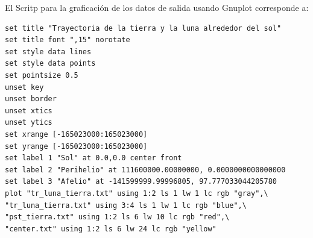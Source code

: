 \documentclass[12pt,a4paper,twoside]{article}
\begin{document}
El Scritp para la graficación de los datos de salida usando Gnuplot corresponde a:
\begin{verbatim}
set title "Trayectoria de la tierra y la luna alrededor del sol"
set title font ",15" norotate
set style data lines
set style data points
set pointsize 0.5
unset key
unset border
unset xtics
unset ytics
set xrange [-165023000:165023000]
set yrange [-165023000:165023000]
set label 1 "Sol" at 0.0,0.0 center front
set label 2 "Perihelio" at 111600000.00000000, 0.0000000000000000
set label 3 "Afelio" at -141599999.99996805, 97.777033044205780
plot "tr_luna_tierra.txt" using 1:2 ls 1 lw 1 lc rgb "gray",\
"tr_luna_tierra.txt" using 3:4 ls 1 lw 1 lc rgb "blue",\
"pst_tierra.txt" using 1:2 ls 6 lw 10 lc rgb "red",\
"center.txt" using 1:2 ls 6 lw 24 lc rgb "yellow"
\end{verbatim}
\end{document}
